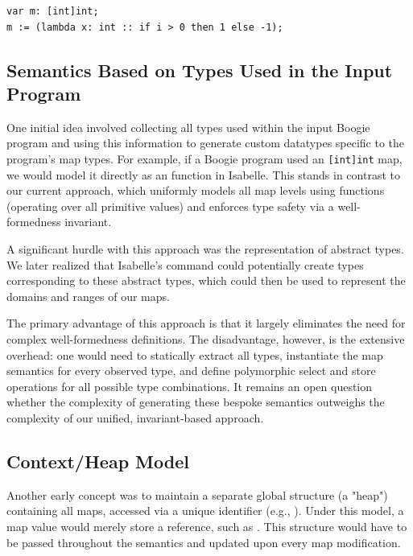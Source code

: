 \begin{lstlisting}[numbers=none]
var m: [int]int;
m := (lambda x: int :: if i > 0 then 1 else -1);
\end{lstlisting}


\subsection{Semantics Based on Types Used in the Input Program}

One initial idea involved collecting all types used within the input Boogie program
and using this information to generate custom datatypes specific to the program's map types.
For example, if a Boogie program used an \lstinline[columns=fixed]{[int]int} map, we would model it directly as an  function in Isabelle.
This stands in contrast to our current approach, which uniformly models all map levels using  functions
(operating over all primitive values) and enforces type safety via a well-formedness invariant.

A significant hurdle with this approach was the representation of abstract types.
We later realized that Isabelle's  command could potentially create types corresponding to these abstract types,
which could then be used to represent the domains and ranges of our maps.

The primary advantage of this approach is that it largely eliminates the need for complex well-formedness definitions.
The disadvantage, however, is the extensive overhead: one would need to statically extract all types, instantiate the map semantics for every observed type, and define polymorphic select and store operations for all possible type combinations. It remains an open question whether the complexity of generating these bespoke semantics outweighs the complexity of our unified, invariant-based approach.

\subsection{Context/Heap Model}
\label{sec:contex-model}

Another early concept was to maintain a separate global structure (a "heap") containing all maps,
accessed via a unique identifier (e.g., ).
Under this model, a map value would merely store a reference, such as .
This structure would have to be passed throughout the semantics and updated upon every map modification.

